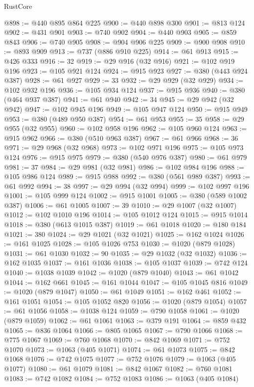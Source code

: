 \begin{lexlean}{RustCore}
\begin{coremodule}
{\begin{coremodule}
{{{{{{{{{{{{{{{{{{{{{{{{{{{{{{{{{{{{{{{{{{{{@898 := @440 @895 @864 @225
@900 := @440 @898 @300
@901 := @813 @124
@902 := @431 @901
@903 := @740 @902
@904 := @440 @903
@905 := @859 @843
@906 := @740 @905
@908 := @904 @906 @225
@909 := @900 @908
@910 := @893 @909
@913 := @737 (@886 @910 @225)
@914 := @61 @913
@915 := @426 @333
@916 := 32
@919 := @29 @916 (@32 @916)
@921 := @102 @919 @196
@923 := @105 @921 @124
@924 := @915 @923
@927 := @380 (@443 @924 @387)
@928 := @61 @927
@929 := 33
@932 := @29 @929 (@32 @929)
@934 := @102 @932 @196
@936 := @105 @934 @124
@937 := @915 @936
@940 := @380 (@464 @937 @387)
@941 := @61 @940
@942 := 34
@945 := @29 @942 (@32 @942)
@947 := @102 @945 @196
@949 := @105 @947 @124
@950 := @915 @949
@953 := @380 (@489 @950 @387)
@954 := @61 @953
@955 := 35
@958 := @29 @955 (@32 @955)
@960 := @102 @958 @196
@962 := @105 @960 @124
@963 := @915 @962
@966 := @380 (@510 @963 @387)
@967 := @61 @966
@968 := 36
@971 := @29 @968 (@32 @968)
@973 := @102 @971 @196
@975 := @105 @973 @124
@976 := @915 @975
@979 := @380 (@540 @976 @387)
@980 := @61 @979
@981 := 37
@984 := @29 @981 (@32 @981)
@986 := @102 @984 @196
@988 := @105 @986 @124
@989 := @915 @988
@992 := @380 (@561 @989 @387)
@993 := @61 @992
@994 := 38
@997 := @29 @994 (@32 @994)
@999 := @102 @997 @196
@1001 := @105 @999 @124
@1002 := @915 @1001
@1005 := @380 (@589 @1002 @387)
@1006 := @61 @1005
@1007 := 39
@1010 := @29 @1007 (@32 @1007)
@1012 := @102 @1010 @196
@1014 := @105 @1012 @124
@1015 := @915 @1014
@1018 := @380 (@613 @1015 @387)
@1019 := @61 @1018
@1020 := @180 @184
@1021 := 380
@1024 := @29 @1021 (@32 @1021)
@1025 := @162 @1024
@1026 := @161 @1025
@1028 := @105 @1026 @753
@1030 := @1020 (@879 @1028)
@1031 := @61 @1030
@1032 := 90
@1035 := @29 @1032 (@32 @1032)
@1036 := @162 @1035
@1037 := @161 @1036
@1038 := @105 @1037
@1039 := @742 @124
@1040 := @1038 @1039
@1042 := @1020 (@879 @1040)
@1043 := @61 @1042
@1044 := @162 @661
@1045 := @161 @1044
@1047 := @105 @1045 @816
@1049 := @1020 (@879 @1047)
@1050 := @61 @1049
@1051 := @162 @461
@1052 := @161 @1051
@1054 := @105 @1052 @820
@1056 := @1020 (@879 @1054)
@1057 := @61 @1056
@1058 := @1038 @124
@1059 := @790 @1058
@1061 := @1020 (@879 @1059)
@1062 := @61 @1061
@1063 := @379 @191
@1064 := @859 @432
@1065 := @836 @1064
@1066 := @805 @1065
@1067 := @790 @1066
@1068 := @775 @1067
@1069 := @760 @1068
@1070 := @842 @1069
@1071 := @752 @1070
@1073 := @1063 (@405 @1071)
@1074 := @61 @1073
@1075 := @842 @1068
@1076 := @742 @1075
@1077 := @752 @1076
@1079 := @1063 (@405 @1077)
@1080 := @61 @1079
@1081 := @842 @1067
@1082 := @760 @1081
@1083 := @742 @1082
@1084 := @752 @1083
@1086 := @1063 (@405 @1084)
}}}}}}}}}}}}}}}}}}}}}}}}}}}}}}}}}}}}}}}}}}}}
\end{coremodule}}
\end{coremodule}
\end{lexlean}
